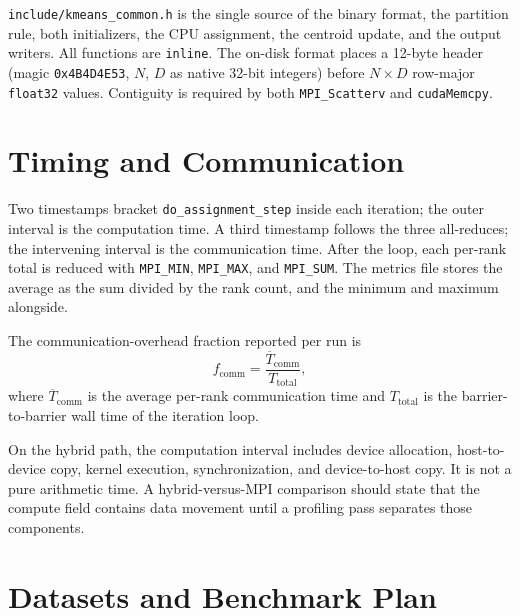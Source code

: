 \documentclass[12pt,a4paper]{article}
\DeclareRobustCommand{\code}[1]{\texttt{#1}}
\DeclareRobustCommand{\file}[1]{\texttt{#1}}
\begin{document}
\file{include/kmeans\_common.h} is the single source of the binary format, the partition rule, both initializers, the CPU assignment, the centroid update, and the output writers. All functions are \code{inline}. The on-disk format places a 12-byte header (magic \texttt{0x4B4D4E53}, $N$, $D$ as native 32-bit integers) before $N \times D$ row-major \texttt{float32} values. Contiguity is required by both \code{MPI\_Scatterv} and \code{cudaMemcpy}.

\section{Timing and Communication}
\label{sec:timing}

Two timestamps bracket \code{do\_assignment\_step} inside each iteration; the outer interval is the computation time. A third timestamp follows the three all-reduces; the intervening interval is the communication time. After the loop, each per-rank total is reduced with \code{MPI\_MIN}, \code{MPI\_MAX}, and \code{MPI\_SUM}. The metrics file stores the average as the sum divided by the rank count, and the minimum and maximum alongside.

The communication-overhead fraction reported per run is
\begin{equation}
  f_{\mathrm{comm}} = \frac{\overline{T}_{\mathrm{comm}}}{T_{\mathrm{total}}} ,
  \label{eq:overhead}
\end{equation}
where $\overline{T}_{\mathrm{comm}}$ is the average per-rank communication time and $T_{\mathrm{total}}$ is the barrier-to-barrier wall time of the iteration loop.

On the hybrid path, the computation interval includes device allocation, host-to-device copy, kernel execution, synchronization, and device-to-host copy. It is not a pure arithmetic time. A hybrid-versus-MPI comparison should state that the compute field contains data movement until a profiling pass separates those components.

\section{Datasets and Benchmark Plan}
\label{sec:data}
\end{document}
